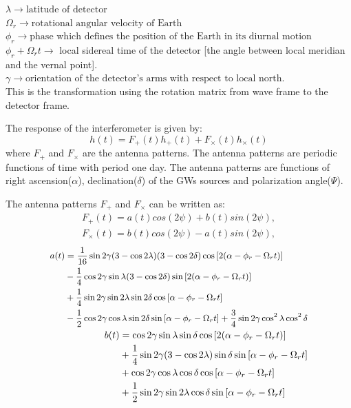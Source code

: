 \documentclass{ttuthes2007}
\begin{document}
$\lambda \rightarrow \text{latitude of detector}$\\
$\Omega_r \rightarrow \text{rotational angular velocity of Earth}$\\
$\phi_r \rightarrow \text{phase which defines the position of the Earth in its
diurnal motion}$\\
$\phi_r + \Omega_r t \rightarrow$ local sidereal time of the detector [the
angle between local meridian and the vernal point].\\
$\gamma \rightarrow \text{orientation of the detector's arms with respect to
local north.}$\\
This is the transformation using the rotation matrix from wave frame to the
detector frame. 

The response of the interferometer is given by:
\begin{equation}
h(t) = F_+(t) h_+(t) + F_\times(t) h_\times(t) 
\end{equation}
where $F_+$ and $F_\times$ are the antenna patterns. The antenna patterns are periodic
functions of time with period one day. The antenna patterns are 
functions of right ascension($\alpha$), declination($\delta$) of the \acp{GW}
sources and polarization angle($\Psi$). 

The antenna patterns $F_+$ and $F_\times$ can be written as:
\begin{align*}
F_+(t) = a(t)cos(2\psi) + b(t) sin(2\psi),\\
F_\times(t) = b(t)cos(2\psi) - a(t) sin(2\psi),
\end{align*}
\begin{align}
\small
\begin{split}\label{eq:a}
a(t) &=
\frac{1}{16}\sin{2\gamma}(3-\cos{2\lambda})(3-\cos{2\delta})\cos{[2(\alpha-\phi_r-\Omega_rt)]}\\
&-\frac{1}{4}\cos{2\gamma} \sin{\lambda} (3-\cos{2\delta})
\sin{[2(\alpha-\phi_r-\Omega_rt)]}\\
&+\frac{1}{4}\sin{2\gamma} \sin{2\lambda} \sin{2\delta}
\cos{[\alpha-\phi_r-\Omega_r t]} \\
&-\frac{1}{2}\cos{2\gamma} \cos{\lambda} \sin{2\delta}
\sin{[\alpha-\phi_r-\Omega_r t]}
+\frac{3}{4} \sin{2\gamma} \cos^2{\lambda} \cos^2{\delta}
\end{split}\\
\begin{split}\label{eq:b}
b(t)& =\cos{2\gamma} \sin{\lambda} \sin{\delta} \cos{[2(\alpha-\phi_r-\Omega_r
t)]}\\ 
&+\frac{1}{4} \sin{2\gamma} (3-\cos{2\lambda}) \sin{\delta}
\sin{[\alpha-\phi_r-\Omega_rt]}\\
&+ \cos{2\gamma} \cos{\lambda} \cos{\delta} \cos{[\alpha-\phi_r-\Omega_r t]}\\
&+\frac{1}{2}\sin{2\gamma} \sin{2\lambda} \cos{\delta}
\sin{[\alpha-\phi_r-\Omega_rt]}
\end{split}
\end{align}
\end{document}
